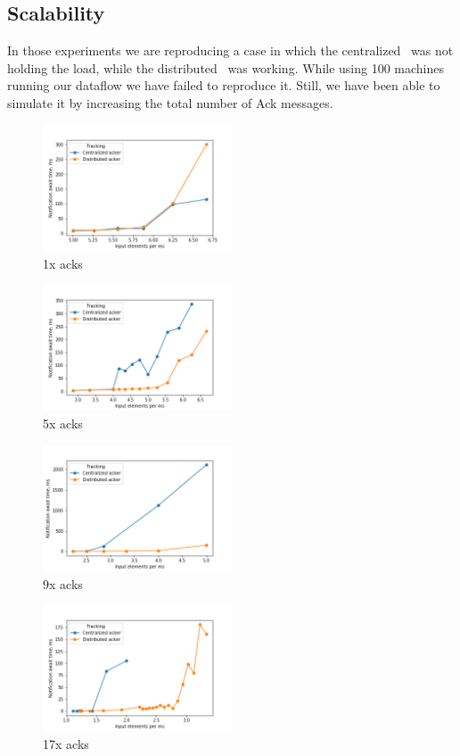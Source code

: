 \subsection{Scalability}

In those experiments we are reproducing a case in which the centralized \tracker\ was not holding the load, while the distributed \tracker\ was working. While using 100 machines running our dataflow we have failed to reproduce it. Still, we have been able to simulate it by increasing the total number of Ack messages.

\begin{figure}[htbp]
  \centering
  \includegraphics[width=0.50\textwidth]{pics/scalability_01x.png}
  \caption{1x acks}
\end{figure}
\begin{figure}[htbp]
  \centering
  \includegraphics[width=0.50\textwidth]{pics/scalability_05x.png}
  \caption{5x acks}
\end{figure}
\begin{figure}[htbp]
  \centering
  \includegraphics[width=0.50\textwidth]{pics/scalability_09x.png}
  \caption{9x acks}
\end{figure}
\begin{figure}[htbp]
  \centering
  \includegraphics[width=0.50\textwidth]{pics/scalability_17x.png}
  \caption{17x acks}
\end{figure}

